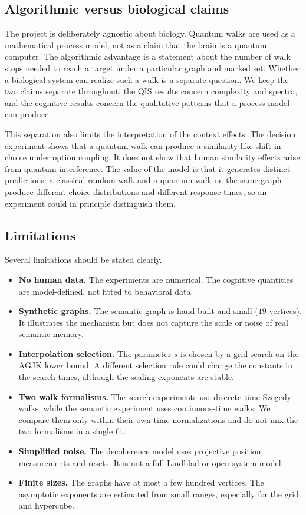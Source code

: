 \subsection{Algorithmic versus biological claims}
\label{sec:discussion-claims}

The project is deliberately agnostic about biology. Quantum walks are used as a
mathematical process model, not as a claim that the brain is a quantum computer.
The algorithmic advantage is a statement about the number of walk steps needed
to reach a target under a particular graph and marked set. Whether a biological
system can realize such a walk is a separate question. We keep the two claims
separate throughout: the QIS results concern complexity and spectra, and the
cognitive results concern the qualitative patterns that a process model can
produce.

This separation also limits the interpretation of the context effects. The
decision experiment shows that a quantum walk can produce a similarity-like
shift in choice under option coupling. It does not show that human similarity
effects arise from quantum interference. The value of the model is that it
generates distinct predictions: a classical random walk and a quantum walk on
the same graph produce different choice distributions and different response
times, so an experiment could in principle distinguish them.

\subsection{Limitations}
\label{sec:discussion-limitations}

Several limitations should be stated clearly.
\begin{itemize}[leftmargin=1.4em]
  \item \textbf{No human data.} The experiments are numerical. The cognitive
  quantities are model-defined, not fitted to behavioral data.
  \item \textbf{Synthetic graphs.} The semantic graph is hand-built and small
  ($19$ vertices). It illustrates the mechanism but does not capture the scale
  or noise of real semantic memory.
  \item \textbf{Interpolation selection.} The parameter $s$ is chosen by a
  grid search on the AGJK lower bound. A different selection rule could change
  the constants in the search times, although the scaling exponents are stable.
  \item \textbf{Two walk formalisms.} The search experiments use discrete-time
  Szegedy walks, while the semantic experiment uses continuous-time walks. We
  compare them only within their own time normalizations and do not mix the
  two formalisms in a single fit.
  \item \textbf{Simplified noise.} The decoherence model uses projective
  position measurements and resets. It is not a full Lindblad or open-system
  model.
  \item \textbf{Finite sizes.} The graphs have at most a few hundred vertices.
  The asymptotic exponents are estimated from small ranges, especially for the
  grid and hypercube.
\end{itemize}

